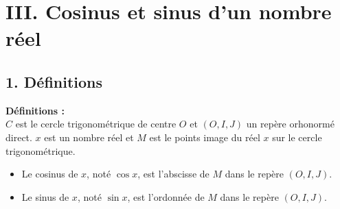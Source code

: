 \documentclass[11pt,a4paper]{article}
\begin{document}
\newpage

\section*{III. Cosinus et sinus d'un nombre réel}
\subsection*{1. Définitions}
\begin{mdframed}[style=definitionStyle]
    \textbf{Définitions :} ~\\
    $C$ est le cercle trigonométrique de centre $O$ et $(O,I,J)$ un repère orhonormé direct. $x$ est un nombre réel et $M$ est le points image du réel $x$ sur le cercle trigonométrique.
    \begin{itemize}
        \item Le cosinus de $x$, noté $\cos{x}$, est l'abscisse de $M$ dans le repère $(O,I,J)$.
        \item Le sinus de $x$, noté $\sin{x}$, est l'ordonnée de $M$ dans le repère $(O,I,J)$.
    \end{itemize}
\end{mdframed}
\end{document}
